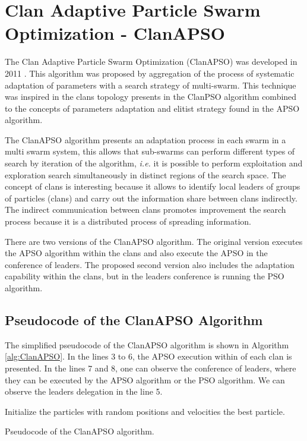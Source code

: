 \section{Clan Adaptive Particle Swarm Optimization - ClanAPSO}\label{sec:ClanAPSO}
The Clan Adaptive Particle Swarm Optimization (ClanAPSO) was developed in 2011 \cite{ClanAPSO:Pontes2011}. This algorithm was proposed by aggregation of the process of systematic adaptation of parameters with a search strategy of multi-swarm. This technique was inspired in the clans topology presents in the ClanPSO algorithm combined to the concepts of parameters adaptation and elitist strategy found in the APSO algorithm.

The ClanAPSO algorithm presents an adaptation process in each swarm in a multi swarm system, this allows that sub-swarms can perform different types of search by iteration of the algorithm, \textit{i.e.} it is possible to perform exploitation and exploration search simultaneously in distinct regions of the search space. The concept of clans is interesting because it allows to identify local leaders of groups of particles (clans) and carry out the information share between clans indirectly. The indirect communication between clans promotes improvement the search process because it is a distributed process of spreading information.

There are two versions of the ClanAPSO algorithm. The original version \cite{ClanAPSO:Pontes2011} executes the APSO algorithm within the clans and also execute the APSO in the conference of leaders. The proposed second version \cite{ClanAPSO:Vitorino2011} also includes the adaptation capability within the clans, but in the leaders conference is running the PSO algorithm.

\subsection{Pseudocode of the ClanAPSO Algorithm}
The simplified pseudocode of the ClanAPSO algorithm is shown in Algorithm \ref{alg:ClanAPSO}. In the lines 3 to 6, the APSO execution within of each clan is presented. In the lines 7 and 8, one can observe the conference of leaders, where they can be executed by the APSO algorithm or the PSO algorithm. We can observe the leaders delegation in the line 5.

\begin{algorithm}[!h]
    Initialize the particles with random positions and velocities\;
    \Return the best particle.
    \caption{Pseudocode of the ClanAPSO algorithm.}
    \label{alg:ClanAPSO}
\end{algorithm}

